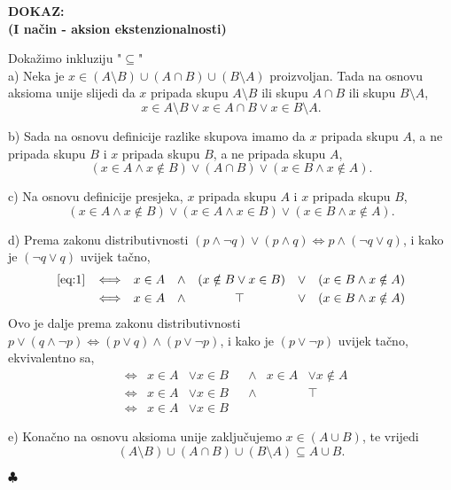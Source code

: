 \documentclass{article}
\newenvironment{dokaz}
    {\noindent\textbf{DOKAZ:}\\} {\hfill $\clubsuit$}
\begin{document}
\begin{dokaz}

    \noindent\textbf{(I način - aksion ekstenzionalnosti)}
    \smallskip

    \noindent
    Dokažimo inkluziju "$\subseteq $"\\
    a) Neka je $x\in (A\setminus B)\cup (A\cap B)\cup (B\setminus A)$ proizvoljan. Tada na osnovu aksioma unije slijedi da $x$ pripada skupu $A\setminus B$ ili skupu $A\cap B$ ili skupu $B\setminus A$,
    $$x\in A\setminus B\vee x\in A\cap B\vee x\in B\setminus A.$$
    \smallskip

    \noindent
    b) Sada na osnovu definicije razlike skupova imamo da $x$ pripada skupu $A$, a ne pripada skupu $B$ i $x$ pripada skupu $B$, a ne pripada skupu $A$,
    $$(x\in A\land x\notin B)\vee (A\cap B)\vee (x\in B\land x\notin A).$$
    \smallskip

    \noindent
    c) Na osnovu definicije presjeka, $x$ pripada skupu $A$ i $x$ pripada skupu $B$,
    \begin{equation}
        (x\in A\land x\notin B)\vee (x\in A\land x\in B)\vee (x\in B\land x\notin A). \label{eq:1}
    \end{equation}
    \smallskip

    \noindent
    d) Prema zakonu distributivnosti $(p\land \lnot q)\vee (p\land q)\Longleftrightarrow  p\land (\lnot q\vee q)$, i kako je $(\lnot q\vee q)$ uvijek tačno,
    \begin{align*}
        \eqref{eq:1}\hspace{8px} &\Longleftrightarrow & &x\in A & &\land & (x\notin B&\vee x\in B) & &\vee & &(x\in B\land x\notin A)\\
                           &\Longleftrightarrow & &x\in A & &\land & &\top & &\vee & &(x\in B\land x\notin A)
    \end{align*}
    Ovo je dalje prema zakonu distributivnosti $p\vee (q\land \lnot p)\Longleftrightarrow (p\vee q)\land (p\vee \lnot p)$, i kako je $(p\vee \lnot p)$ uvijek tačno, ekvivalentno sa,
    \begin{align*}
        &\Longleftrightarrow & x\in A&\vee x\in B & &\land & x\in A&\vee x\notin A\\
        &\Longleftrightarrow & x\in A&\vee x\in B & &\land & &\top \\
        &\Longleftrightarrow & x\in A&\vee x\in B
    \end{align*}
    \smallskip

    \noindent
    e) Konačno na osnovu aksioma unije zaključujemo $x\in (A\cup B)$, te vrijedi
    \begin{equation}
        (A\setminus B)\cup (A\cap B)\cup (B\setminus A)\subseteq A\cup B.\label{eq:2}
    \end{equation}
    \bigskip


\end{dokaz}
\end{document}
